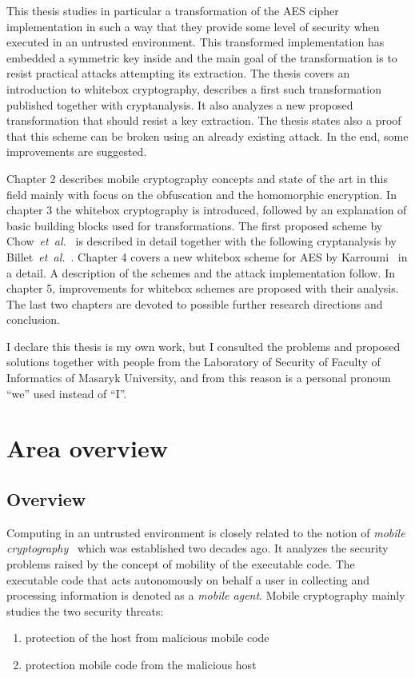 \documentclass[11pt,oneside,final]{fithesis2}
\newcommand{\eal}{\emph{et~al.}}
\begin{document}
    This thesis studies in particular a transformation of the AES cipher~\citep{2002-daemen} implementation in such a way that they provide some
    level of security when executed in an untrusted environment. This transformed implementation has embedded a symmetric key inside
    and the main goal of the transformation is to resist practical attacks attempting its extraction. The thesis covers an introduction
    to whitebox cryptography, describes a first such transformation published together with cryptanalysis. It also analyzes a new 
    proposed transformation that should resist a key extraction. The thesis states also a proof that this scheme can be broken 
    using an already existing attack. In the end, some improvements are suggested.

    Chapter 2 describes mobile cryptography concepts and state of the art in this field mainly with focus on the obfuscation and the homomorphic encryption.
    In chapter 3 the whitebox cryptography is introduced, followed by an explanation of basic building blocks used for transformations. The first proposed scheme 
    by Chow~\eal~\citep{Chow02white-boxcryptography} is described in detail together with the following cryptanalysis by Billet~\eal~\citep{Billet:2004:CWB:2080787.2080809}.
    Chapter 4 covers a new whitebox scheme for AES by Karroumi~\citep{Karroumi:2010:PWA:2041036.2041060} in a detail. 
    A description of the schemes and the attack implementation follow. 
    In chapter 5, improvements for whitebox schemes are proposed with their analysis. The last two chapters are devoted to possible further 
    research directions and conclusion.

    I declare this thesis is my own work, but I consulted the problems and proposed solutions together with people from the Laboratory of Security of
    Faculty of Informatics of Masaryk University, and from this reason is a personal pronoun ``we'' used instead of ``I''.

\chapter{Area overview}\label{sec:theory}
    
    \section{Overview}
    Computing in an untrusted environment is closely related to the notion of \emph{mobile cryptography}~\citep{mobile_cryptography} which was established two decades ago.
    It analyzes the security problems raised by the concept of mobility of the executable code. The executable code that acts autonomously on behalf a user in collecting 
    and processing information is denoted as a \emph{mobile agent}. Mobile cryptography mainly studies the two security threats:
    \begin{enumerate}
     \item protection of the host from malicious mobile code
     \item protection mobile code from the malicious host
    \end{enumerate}
    
\end{document}
